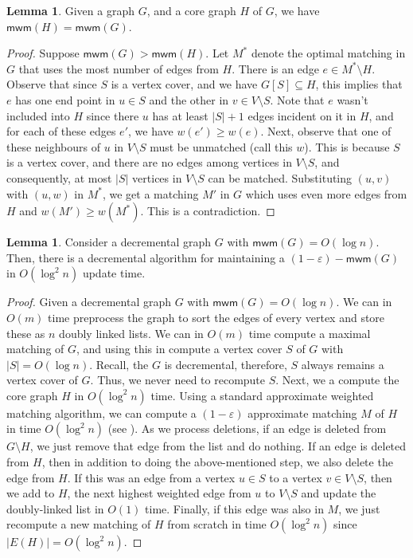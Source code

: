 \documentclass[a4paper,11pt]{article}
\newcommand{\card}[1]{|#1|}
\theoremstyle{definition}
\theoremstyle{definition}
\theoremstyle{definition}
\theoremstyle{definition}
\theoremstyle{definition}
\newtheorem{lemma2}[definition2]{Lemma}
\theoremstyle{definition}
\theoremstyle{definition}
\theoremstyle{definition}
\theoremstyle{definition}
\theoremstyle{definition}
\theoremstyle{definition}
\theoremstyle{definition}
\theoremstyle{definition}
\theoremstyle{definition}
\theoremstyle{definition}
\begin{document}
\begin{lemma2}\cite{GP13}
Given a graph $G$, and a core graph $H$ of $G$, we have $\textsf{mwm}(H)=\textsf{mwm}(G)$.
\end{lemma2}
\begin{proof}
Suppose $\textsf{mwm}(G)>\textsf{mwm}(H)$. Let $M^*$ denote the optimal matching in $G$ that uses the most number of edges from $H$. There is an edge $e\in M^*\setminus H$. Observe that since $S$ is a vertex cover, and we have $G[S]\subseteq H$, this implies that $e$ has one end point in $u\in S$ and the other in $v\in V\setminus S$. Note that $e$ wasn't included into $H$ since there $u$ has at least $\card{S}+1$ edges incident on it in $H$, and for each of these edges $e'$, we have $w(e')\geqslant w(e)$. Next, observe that one of these neighbours of $u$ in $V\setminus S$ must be unmatched (call this $w$). This is because $S$ is a vertex cover, and there are no edges among vertices in $V\setminus S$, and consequently, at most $|S|$ vertices in $V\setminus S$ can be matched. Substituting $(u,v)$ with $(u,w)$ in $M^*$, we get a matching $M'$ in $G$ which uses even more edges from $H$ and $w(M')\geqslant w(M^*)$. This is a contradiction. 
\end{proof}

\begin{lemma2}
Consider a decremental graph $G$ with $\textsf{mwm}(G)=O(\log n)$. Then, there is a decremental algorithm for maintaining a $(1-\varepsilon)-\textsf{mwm}(G)$ in $O(\log^2n)$ update time.
\end{lemma2}
\begin{proof}
Given a decremental graph $G$ with $\textsf{mwm}(G)=O(\log n)$. We can in $O(m)$ time preprocess the graph to sort the edges of every vertex and store these as $n$ doubly linked lists. We can in $O(m)$ time compute a maximal matching of $G$, and using this in compute a vertex cover $S$ of $G$ with $|S|=O(\log n)$. Recall, the $G$ is decremental, therefore, $S$ always remains a vertex cover of $G$. Thus, we never need to recompute $S$. Next, we a compute the core graph $H$ in $O(\log^2n)$ time. Using a standard approximate weighted matching algorithm, we can compute a $(1-\varepsilon)$ approximate matching $M$ of $H$ in time $O(\log^2n)$ (see ). As we process deletions, if an edge is deleted from $G\setminus H$, we just remove that edge from the list and do nothing. If an edge is deleted from $H$, then in addition to doing the above-mentioned step, we also delete the edge from $H$. If this was an edge from a vertex $u\in S$ to a vertex $v\in V\setminus S$, then we add to $H$, the next highest weighted edge from $u$ to $V\setminus S$ and update the doubly-linked list in $O(1)$ time. Finally, if this edge was also in $M$, we just recompute a new matching of $H$ from scratch in time $O(\log^2n)$ since $\card{E(H)}=O(\log^2n)$.
\end{proof}
\end{document}
